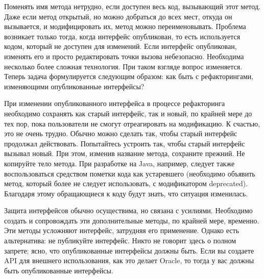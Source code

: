 \documentclass{../../text-style}
\begin{document}
Поменять имя метода нетрудно, если доступен весь код, вызывающий этот метод. Даже если метод открытый, но можно добраться до всех мест, откуда он вызывается, и модифицировать их, метод можно переименовывать. Проблема возникает только тогда, когда интерфейс опубликован, то есть используется кодом, который не доступен для изменений. Если интерфейс опубликован, изменять его и просто редактировать точки вызова небезопасно. Необходима несколько более сложная технология. При таком взгляде вопрос изменяется. Теперь задача формулируется следующим образом: как быть с рефакторингами, изменяющими опубликованные интерфейсы? 

При изменении опубликованного интерфейса в процессе рефакторинга необходимо сохранять как старый интерфейс, так и новый, по крайней мере до тех пор, пока пользователи не смогут отреагировать на модификацию. К счастью, это не очень трудно. Обычно можно сделать так, чтобы старый интерфейс продолжал действовать. Попытайтесь устроить так, чтобы старый интерфейс вызывал новый. При этом, изменив название метода, сохраните прежний. Не копируйте тело метода. При разработке на Java, например, следует также воспользоваться средством пометки кода как устаревшего (необходимо объявить метод, который более не следует использовать, с модификатором deprecated). Благодаря этому обращающиеся к коду будут знать, что ситуация изменилась.

Защита интерфейсов обычно осуществима, но связана с усилиями. Необходимо создать и сопровождать эти дополнительные методы, по крайней мере, временно. Эти методы усложняют интерфейс, затрудняя его применение. Однако есть альтернатива: не публикуйте интерфейс. Никто не говорит здесь о полном запрете; ясно, что опубликованные интерфейсы должны быть. Если вы создаете API для внешнего использования, как это делает Oracle, то тогда у вас должны быть опубликованные интерфейсы.
\end{document}
